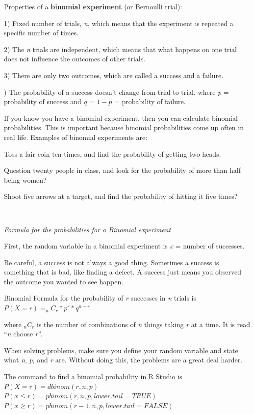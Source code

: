 \documentclass[]{book}
\begin{document}
Properties of a \textbf{binomial experiment} (or Bernoulli trial):

1) Fixed number of trials, \emph{n}, which means that the experiment is repeated a specific number of times.

2) The \emph{n} trials are independent, which means that what happens on one trial does not influence the outcomes of other trials.

3) There are only two outcomes, which are called a success and a failure.

) The probability of a success doesn't change from trial to trial, where \emph{p} = probability of success and \emph{q} = \(1-p\) = probability of failure.

If you know you have a binomial experiment, then you can calculate binomial probabilities. This is important because binomial probabilities come up often in real life. Examples of binomial experiments are:

Toss a fair coin ten times, and find the probability of getting two heads.

Question twenty people in class, and look for the probability of more than half being women?

Shoot five arrows at a target, and find the probability of hitting it five times?

\textbf{\\
}

\emph{Formula for the probabilities for a Binomial experiment}

First, the random variable in a binomial experiment is \emph{x} = number of successes.

Be careful, a success is not always a good thing. Sometimes a success is something that is bad, like finding a defect. A success just means you observed the outcome you wanted to see happen.

Binomial Formula for the probability of \emph{r} successes in \emph{n} trials is \(P(X=r)=_nC_r*p^r*q^{n-r}\)

where \(_nC_r\) is the number of combinations of \emph{n} things taking \emph{r} at a time. It
is read ``\emph{n} choose \emph{r}''.

When solving problems, make sure you define your random variable and state what \emph{n}, \emph{p}, and \emph{r} are. Without doing this, the problems are a great deal harder.

The command to find a binomial probability in R Studio is
\(P(X=r)=dbinom(r, n, p)\)
\(P(x \le r)=pbinom(r, n, p, lower.tail=TRUE)\)
\(P(x \ge r)=pbinom(r-1, n, p, lower.tail=FALSE)\)
\end{document}
